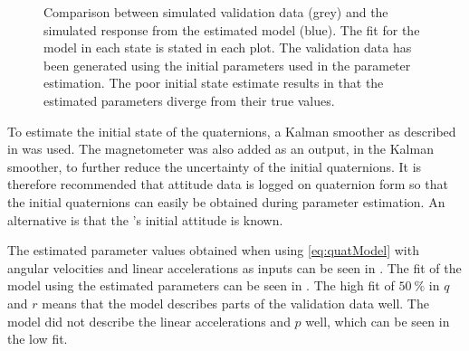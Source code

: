 \begin{figure}[htbp]
  \centering %
  \qquad
  \qquad
    \qquad
    \qquad
    \qquad
  \caption{\label{fig:angVelSim}%
    Comparison between simulated validation data (grey) and the simulated response from the estimated model (blue). The fit for the model in each state is stated in each plot. The validation data has been generated using the initial parameters used in the parameter estimation. The poor initial state estimate results in that the estimated parameters diverge from their true values.}
\end{figure}  

To estimate the initial state of the quaternions, a Kalman smoother as described in \citet{Wallin} was used. The magnetometer was also added as an output, in the Kalman smoother, to further reduce the uncertainty of the initial quaternions. It is therefore recommended that attitude data is logged on quaternion form so that the initial quaternions can easily be obtained during parameter estimation. An alternative is that the \abbrROV's initial attitude is known. 

The estimated parameter values obtained when using \eqref{eq:quatModel} with angular velocities and linear accelerations as inputs can be seen in . The fit of the model using the estimated parameters can be seen in . The high fit of $50\ \%$ in $q$ and $r$ means that the model describes parts of the validation data well. The model did not describe the linear accelerations and $p$ well, which can be seen in the low fit.


